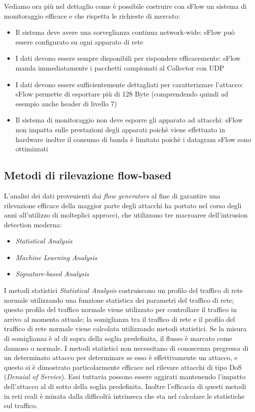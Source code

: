\documentclass[12pt,a4paper,openright,twoside]{report}
\begin{document}
Vediamo ora pi\`u nel dettaglio come \`e possibile costruire con sFlow un sistema di monitoraggio efficace
e che rispetta le richieste di mercato:
\begin{itemize}
  \item Il sistema deve avere una sorveglianza continua network-wide: sFlow pu\`o essere configurato su ogni apparato di rete
  \item I dati devono essere sempre disponibili per rispondere efficacemente: sFlow manda immediatamente
  i pacchetti campionati al Collector con UDP
  \item I dati devono essere sufficientemente dettagliati per caratterizzare l'attacco: sFlow permette di
  esportare pi\`u di 128 Byte (comprendendo quindi ad esempio anche header di livello 7)
  \item Il sistema di monitoraggio non deve esporre gli apparato ad attacchi: sFlow non impatta sulle
  prestazioni degli apparati poich\`e viene effettuato in hardware inoltre il consumo di banda \`e limitato
  poich\`e i datagram sFlow sono ottimizzati
\end{itemize}

\subsection{Metodi di rilevazione flow-based}

L'analisi dei dati provenienti dai {\it flow generators} al fine di garantire una
rilevazione efficace della maggior parte degli attacchi ha portato nel corso degli anni
all'utilizzo di molteplici approcci, che utilizzano tre macroaree dell'intrusion
detection moderna:
\begin{itemize}
  \item {\it Statistical Analysis}
  \item {\it Machine Learning Analysis}
  \item {\it Signature-based Analysis}
\end{itemize}


I metodi statistici {\it Statistical Analysis} costruiscono un profilo del traffico
di rete normale utilizzando una funzione statistica dei parametri del traffico di rete;
questo profilo del traffico normale viene utilizzato per controllare il traffico in
arrivo al momento attuale; la somiglianza tra il traffico di rete e il profilo del
traffico di rete normale viene calcolata utilizzando metodi statistici. Se la misura
di somiglianza \`e al di sopra della soglia predefinita, il flusso \`e marcato come
dannoso o normale. \cite{S4} I metodi statistici non necessitano di conoscenza pregressa
di un determinato attacco per determinare se esso \`e effettivamente un attacco, e questo si
\`e dimostrato particolarmente efficace nel rilevare attacchi di tipo DoS ({\it Denaial of
Service}). Essi tuttavia possono essere aggirati mantenendo l'impatto dell'attacco al di
sotto della soglia predefinita. Inoltre l'efficacia di questi metodi in reti reali
\`e minata dalla difficolt\`a intrinseca che sta nel calcolare le statistiche sul traffico.
\end{document}
